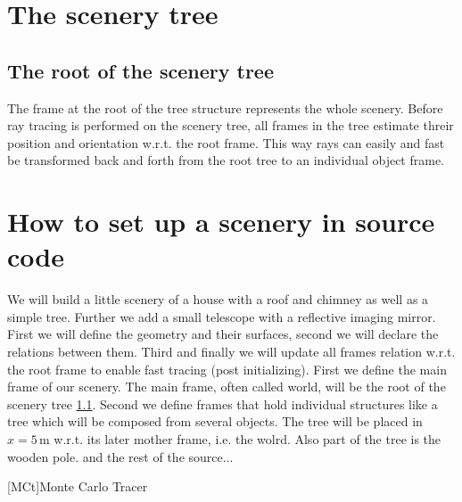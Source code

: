 \documentclass[review]{elsarticle}
\begin{document}
\section{The scenery tree}
\subsection{The root of the scenery tree}
\label{SubSecRootFrame}
The frame at the root of the tree structure represents the whole scenery.
%
Before ray tracing is performed on the scenery tree, all frames in the tree estimate threir position and orientation w.r.t. the root frame.
%
This way rays can easily and fast be transformed back and forth from the root tree to an individual object frame.
\section{How to set up a scenery in source code}
%
We will build a little scenery of a house with a roof and chimney as well as a simple tree. Further we add a small telescope with a reflective imaging mirror.
%
First we will define the geometry and their surfaces, second we will declare the relations between them. Third and finally we will update all frames relation w.r.t. the root frame to enable fast tracing (post initializing).
% 
%
First we define the main frame of our scenery. The main frame, often called world, will be the root of the scenery tree \ref{SubSecRootFrame}. 
%
%
Second we define frames that hold individual structures like a tree which will be composed from several objects. The tree will be placed in $x=5\,$m w.r.t. its later mother frame, i.e. the wolrd. 
%
Also part of the tree is the wooden pole.
and the rest of the source...

\begin{acronym}
    [MCt]{Monte Carlo Tracer}
\end{acronym}
\end{document}

